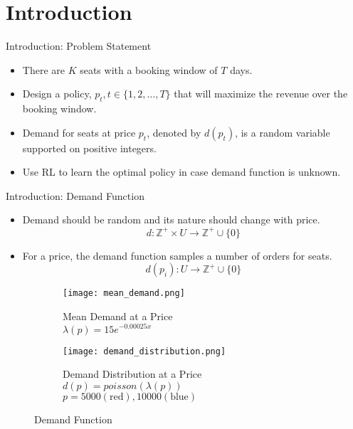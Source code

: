 \section{Introduction}

\begin{frame}{Introduction: Problem Statement}
\begin{itemize}
    \setlength\itemsep{1.5em}
    \item There are $K$ seats with a booking window of $T$ days.
    \item Design a policy, $p_t, t \in \{1, 2, \ldots, T\}$ that will maximize the revenue over the booking window.
    \item Demand for seats at price $p_t$, denoted by $d(p_t)$, is a random variable supported on positive integers.
    \item Use RL to learn the optimal policy in case demand function is unknown.
\end{itemize}
\end{frame}

\begin{frame}{Introduction: Demand Function}
\begin{itemize}
    \item Demand should be random and its nature should change with price.
    $$d: \mathbb{Z}^+ \times U \rightarrow \mathbb{Z}^+ \cup \{0\}$$
    \item For a price, the demand function samples a number of orders for seats.
    $$d(p_i): U \rightarrow \mathbb{Z}^+ \cup \{0\}$$
\end{itemize}
\begin{figure}
    \centering
    \hfill
    \begin{subfigure}[t]{0.45\textwidth}
        \centering
        \texttt{[image: mean\_demand.png]}
        \caption{Mean Demand at a Price \\ $\lambda(p) = 15e^{-0.00025x}$}
    \end{subfigure}
    \hfill
    \begin{subfigure}[t]{0.45\textwidth}
        \centering
        \texttt{[image: demand\_distribution.png]}
        \caption{Demand Distribution at a Price \\ $d(p)=poisson(\lambda(p))$ \\ $p=5000 (\text{red}), 10000 (\text{blue})$}
    \end{subfigure}
    \hfill
    \caption{Demand Function}
\end{figure}
\end{frame}

